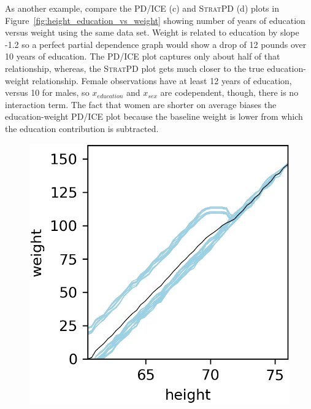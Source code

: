 \documentclass[12pt]{article}
\newcommand{\figref}[1]{Figure~\ref{#1}}
\newcommand{\spd}{\fontfamily{cmr}\textsc{\small StratPD}}
\begin{document}
As another example, compare the PD/ICE (c) and \spd{} (d) plots in \figref{fig:height_education_vs_weight} showing number of years of education versus weight using the same data set. Weight is related to education by slope -1.2 so a perfect partial dependence graph would show a drop of 12 pounds over 10 years of education.   The PD/ICE plot captures only about half of that relationship, whereas, the \spd{} plot gets much closer to the true education-weight relationship. Female observations have at least 12 years of education, versus 10 for males, so $x_{education}$ and $x_{sex}$ are codependent, though, there is no interaction term. The fact that women are shorter on average biases the education-weight PD/ICE plot because the baseline weight is lower from which the education contribution is  subtracted.

\begin{figure}[htbp]
\begin{center}
\includegraphics[scale=0.7]{images/height_vs_weight_pdp.png}

\end{center}
\end{figure}
\end{document}
